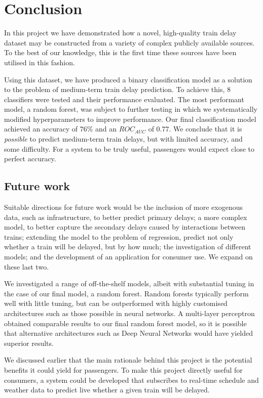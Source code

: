 \documentclass[12pt,a4paper]{article}
\begin{document}
\section{Conclusion}

In this project we have demonstrated how a novel, high-quality train delay dataset may be constructed from a variety of complex publicly available sources. To the best of our knowledge, this is the first time these sources have been utilised in this fashion.  

Using this dataset, we have produced a binary classification model as a solution to the problem of medium-term train delay prediction. To achieve this, $8$ classifiers were tested and their performance evaluated. The most performant model, a random forest, was subject to further testing in which we systematically modified hyperparameters to improve performance. Our final classification model achieved an accuracy of $76\%$ and an $ROC_{AUC}$ of $0.77$. We conclude that it is \textit{possible} to predict medium-term train delays, but with limited accuracy, and some difficulty. For a system to be truly useful, passengers would expect close to perfect accuracy.

\subsection{Future work}

Suitable directions for future work would be the inclusion of more exogenous data, such as infrastructure, to better predict primary delays; a more complex model, to better capture the secondary delays caused by interactions between trains; extending the model to the problem of regression, predict not only whether a train will be delayed, but by how much; the investigation of different models; and the development of an application for consumer use. We expand on these last two.

We investigated a range of off-the-shelf models, albeit with substantial tuning in the case of our final model, a random forest. Random forests typically perform well with little tuning, but can be outperformed with highly customised architectures such as those possible in neural networks. A multi-layer perceptron obtained comparable results to our final random forest model, so it is possible that alternative architectures such as Deep Neural Networks would have yielded superior results.

We discussed earlier that the main rationale behind this project is the potential benefits it could yield for passengers. To make this project directly useful for consumers, a system could be developed that subscribes to real-time schedule and weather data to predict live whether a given train will be delayed.

\clearpage

\end{document}
